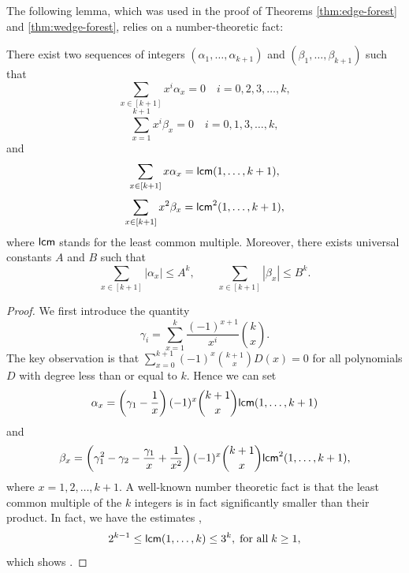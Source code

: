 The following lemma, which was used in the proof of Theorems \ref{thm:edge-forest} and \ref{thm:wedge-forest}, relies on a number-theoretic fact:
\begin{lemma} \label{lmm:moments}
There exist two sequences of integers $(\alpha_1,\ldots,\alpha_{k+1})$ and $(\beta_1,\ldots,\beta_{k+1})$ such that
\begin{equation*}
\sum_{x\in [k+1]} x^i \alpha_x = 0 \quad i = 0, 2, 3, \dots, k,
\end{equation*}
\begin{equation*}
\sum_{x=1}^{k+1} x^i \beta_x = 0 \quad i = 0,1, 3, \dots, k,
\end{equation*}
and
\begin{equation*}
\sum_{x\in [k+1]} x \alpha_x = {\mathsf{lcm}}(1, \dots, k+1),
\end{equation*}
\begin{equation*}
\sum_{x\in [k+1]} x^2 \beta_x  = {\mathsf{lcm}}^2(1, \dots, k+1),
\end{equation*}
where ${\mathsf{lcm}}$ stands for the  least common multiple.
Moreover, there exists universal constants $ A $ and $ B $ such that 
\begin{equation} \label{eq:size}
\sum_{x\in [k+1]} |\alpha_x| \leq A^k, \qquad \sum_{x\in [k+1]} |\beta_x| \leq B^k.
\end{equation}
\end{lemma}

\begin{proof}
We first introduce the quantity
\begin{equation*}
\gamma_i = \sum_{x=1}^{k}\frac{(-1)^{x+1}}{x^i}\binom{k}{x}.
\end{equation*}
The key observation is that $ \sum_{x=0}^{k+1}(-1)^x \binom{k+1}{x}D(x) = 0 $ for all polynomials $ D $ with degree less than or equal to $ k $. Hence we can set
\begin{align*}
\alpha_x = \left(\gamma_1-\frac{1}{x}\right)(-1)^x\binom{k+1}{x}{\mathsf{lcm}}(1, \dots, k+1)
\end{align*}
and
\begin{align*}
\beta_x = \left(\gamma^2_1-\gamma_2 - \frac{\gamma_1}{x} + \frac{1}{x^2}\right)(-1)^x\binom{k+1}{x}{\mathsf{lcm}}^2(1, \dots, k+1),
\end{align*}
where $ x = 1, 2, \dots, k+1 $.
A well-known number theoretic fact is that the least common multiple of the $k$ integers is in fact significantly smaller than their product. In fact, we have the estimates \cite{Nair1982}, \cite{Hanson1972}
\begin{equation*}
2^{k-1} \leq {\mathsf{lcm}}(1, \dots, k) \leq 3^k, \; \text{for all} \; k \geq 1,
\end{equation*} 
which shows .
\end{proof}

